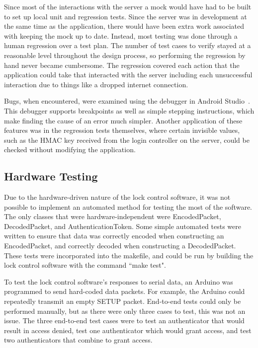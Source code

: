 \documentclass[12pt]{report}
\let\Oldsubsection\subsection
\renewcommand{\subsection}{\FloatBarrier\Oldsubsection}
\begin{document}
Since most of the interactions with the server a mock would have had to be built to set up local unit and regression
tests. Since the server was in development at the same time as the application, there would have been extra work
associated with keeping the mock up to date. Instead, most testing was done through a human regression over a test plan.
The number of test cases to verify stayed at a reasonable level throughout the design process, so performing the
regression by hand never became cumbersome. The regression covered each action that the application could take that
interacted with the server including each unsuccessful interaction due to things like a dropped internet connection.

Bugs, when encountered, were examined using the debugger in Android Studio~\autocite{ANDROIDSTUDIO}. This debugger
supports breakpoints as well as simple stepping instructions, which make finding the cause of an error much simpler.
Another application of these features was in the regression tests themselves, where certain invisible values, such as
the HMAC key received from the login controller on the server, could be checked without modifying the application.

\subsection{Hardware Testing} \label{hardware-testing}

Due to the hardware-driven nature of the lock control software, it was not possible to implement an automated method 
for testing the most of the software. The only classes that were hardware-independent were EncodedPacket, DecodedPacket, and 
AuthenticationToken. Some simple automated tests were written to ensure that data was correctly encoded when 
constructing an EncodedPacket, and correctly decoded when constructing a DecodedPacket. These tests were incorporated 
into the makefile, and could be run by building the lock control software with the command ``make test".

To test the lock control software's responses to serial data, an Arduino was programmed to send hard-coded data packets. 
For example, the Arduino could repeatedly transmit an empty SETUP packet. End-to-end tests could only be performed 
manually, but as there were only three cases to test, this was not an issue. The three end-to-end test cases were to 
test an authenticator that would result in access denied, test one authenticator which would grant access, and test two 
authenticators that combine to grant access.
\end{document}
